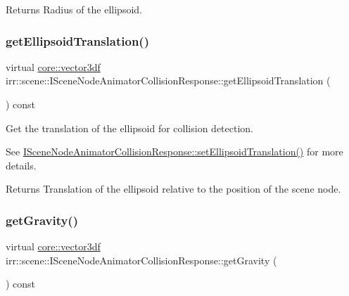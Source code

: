 \begin{DoxyReturn}{Returns}
Radius of the ellipsoid. 
\end{DoxyReturn}
\mbox{\label{classirr_1_1scene_1_1ISceneNodeAnimatorCollisionResponse_aff0a2ad6ff375a85e08a3226e3267286}} 
\subsubsection{\texorpdfstring{get\+Ellipsoid\+Translation()}{getEllipsoidTranslation()}}
{\footnotesize\ttfamily virtual \hyperlink{namespaceirr_1_1core_a06f169d08b5c429f5575acb7edbad811}{core\+::vector3df} irr\+::scene\+::\+I\+Scene\+Node\+Animator\+Collision\+Response\+::get\+Ellipsoid\+Translation (\begin{DoxyParamCaption}{ }\end{DoxyParamCaption}) const\hspace{0.3cm}{\ttfamily [pure virtual]}}



Get the translation of the ellipsoid for collision detection. 

See \hyperlink{classirr_1_1scene_1_1ISceneNodeAnimatorCollisionResponse_a234ec747d320d70dd3e2a4143782ffc7}{I\+Scene\+Node\+Animator\+Collision\+Response\+::set\+Ellipsoid\+Translation()} for more details. \begin{DoxyReturn}{Returns}
Translation of the ellipsoid relative to the position of the scene node. 
\end{DoxyReturn}
\mbox{\label{classirr_1_1scene_1_1ISceneNodeAnimatorCollisionResponse_a1b7c86e8948691ce00f2aa6253c5683a}} 
\subsubsection{\texorpdfstring{get\+Gravity()}{getGravity()}}
{\footnotesize\ttfamily virtual \hyperlink{namespaceirr_1_1core_a06f169d08b5c429f5575acb7edbad811}{core\+::vector3df} irr\+::scene\+::\+I\+Scene\+Node\+Animator\+Collision\+Response\+::get\+Gravity (\begin{DoxyParamCaption}{ }\end{DoxyParamCaption}) const\hspace{0.3cm}{\ttfamily [pure virtual]}}



